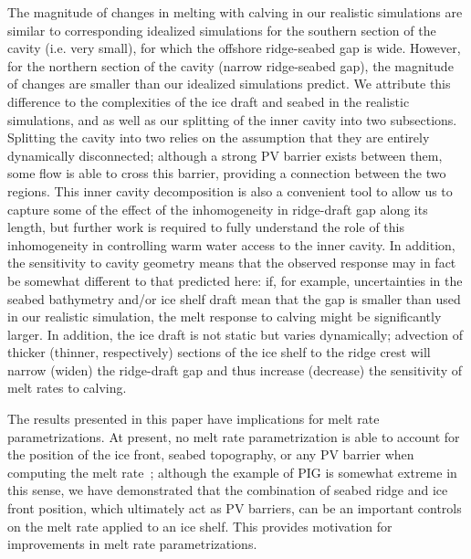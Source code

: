 \documentclass[draft]{agujournal2019}
\begin{document}
The magnitude of changes in melting with calving in our realistic simulations are similar to corresponding idealized simulations for the southern section of the cavity (i.e. very small), for which the offshore ridge-seabed gap is wide. However, for the northern section of the cavity (narrow ridge-seabed gap), the magnitude of changes are smaller than our idealized simulations predict. We attribute this difference to the complexities of the ice draft and seabed in the realistic simulations, and as well as our splitting of the inner cavity into two subsections. Splitting the cavity into two relies on the assumption that they are entirely dynamically disconnected; although a strong PV barrier exists between them, some flow is able to cross this barrier, providing a connection between the two regions. This inner cavity decomposition is also a convenient tool to allow us to capture some of the effect of the inhomogeneity in ridge-draft gap along its length, but further work is required to fully understand the role of this inhomogeneity in controlling warm water access to the inner cavity. In addition, the sensitivity to cavity geometry means that the observed response may in fact be somewhat different to that predicted here: if, for example, uncertainties in the seabed bathymetry and/or ice shelf draft mean that the gap is smaller than used in our realistic simulation, the melt response to calving might be significantly larger. In addition, the ice draft is not static but varies dynamically; advection of thicker (thinner, respectively) sections of the ice shelf to the ridge crest will narrow (widen) the ridge-draft gap and thus increase (decrease) the sensitivity of melt rates to calving.



The results presented in this paper have implications for melt rate parametrizations. At present, no melt rate parametrization is able to account for the position of the ice front, seabed topography, or any PV barrier when computing the melt rate~\cite{AsayDavis2017CurrClimChRep}; although the example of PIG is somewhat extreme in this sense, we have demonstrated that the combination of seabed ridge and ice front position, which ultimately act as PV barriers, can be an important controls on the melt rate applied to an ice shelf. This provides motivation for improvements in melt rate parametrizations. %
\end{document}
